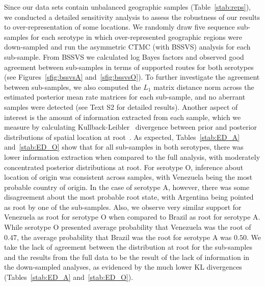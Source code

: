 \documentclass[10pt]{article}
\begin{document}
Since our data sets contain unbalanced geographic samples (Table~\ref{stab:reps}), we conducted a detailed sensitivity analysis to assess the robustness of our results to over-representation of some locations.
We randomly draw five sequence sub-samples for each serotype in which over-represented geographic regions were down-sampled and run the asymmetric CTMC (with BSSVS) analysis for each sub-sample.
From BSSVS we calculated log Bayes factors and observed good agreement between sub-samples in terms of supported routes for both serotypes (see Figures~\ref{sfig:bssvsA} and~\ref{sfig:bssvsO}).
To further investigate the agreement between sub-samples, we also computed the $L_1$ matrix distance norm across the estimated posterior mean rate matrices for each sub-sample, and no aberrant samples were detected (see Text S2 for detailed results).
Another aspect of interest is the amount of information extracted from each sample, which we measure by calculating Kullback-Leibler~\cite{KL} divergence between prior and posterior distributions of spatial location at root~\cite{roots}.
As expected, Tables~\ref{stab:ED_A} and~\ref{stab:ED_O} show that for all sub-samples in both serotypes, there was lower information extraction when compared to the full analysis, with moderately concentrated posterior distributions at root.
For serotype O, inference about location of origin was consistent across samples, with Venezuela being the most probable country of origin.
In the case of serotype A, however, there was some disagreement about the most probable root state, with Argentina being pointed as root by one of the sub-samples.
Also, we observe very similar support for Venezuela as root for serotype O when compared to Brazil as root for serotype A.
While serotype O presented average probability that Venezuela was the root of $0.47$, the average probability that Brazil was the root for serotype A was $0.50$.
We take the lack of agreement between the distribution at root for the sub-samples and the results from the full data to be the result of the lack of information in the down-sampled analyses, as evidenced by the much lower KL divergences (Tables~\ref{stab:ED_A} and~\ref{stab:ED_O}). 
\end{document}
